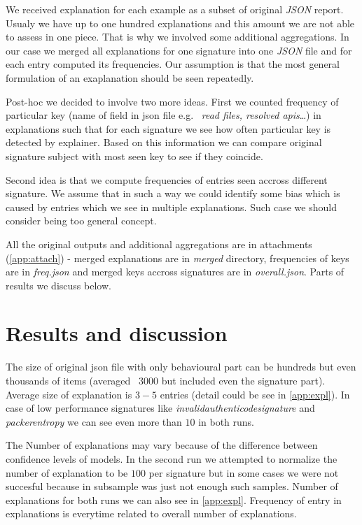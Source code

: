 We received explanation for each example as a subset of original \emph{JSON} report. Usualy we have up to one hundred explanations and this amount we are not able to assess in one piece. That is why we involved some additional aggregations. In our case we merged all explanations for one signature into one \emph{JSON} file and for each entry computed its frequencies. Our assumption is that the most general formulation of an exaplanation should be seen repeatedly. 

Post-hoc we decided to involve two more ideas. First we counted frequency of particular key (name of field in json file e.g. \ \emph{read files, resolved apis}\dots) in explanations such that for each signature we see how often particular key is detected by explainer. Based on this information we can compare original signature subject with most seen key to see if they coincide.

Second idea is that we compute frequencies of entries seen accross different signature. We assume that in such a way we could identify some bias which is caused by entries which we see in multiple explanations. Such case we should consider being too general concept. 

All the original outputs and additional aggregations are in attachments (\ref{app:attach}) - merged explanations are in \emph{merged} directory, frequencies of keys are in \emph{freq.json} and merged keys accross signatures are in \emph{overall.json}. Parts of results we discuss below.


\section{Results and discussion}
The size of original json file with only behavioural part can be hundreds but even thousands of items (averaged \texttildelow~$3000$ but included even the signature part). Average size of explanation is $3-5$ entries (detail could be see in \ref{app:expl}). In case of low performance signatures like \emph{invalidauthenticodesignature} and \emph{packerentropy} we can see even more than $10$ in both runs.

The Number of explanations may vary because of the difference between confidence levels of models. In the second run we attempted to normalize the number of explanation to be $100$ per signature but in some cases we were not succesful because in subsample was just not enough such samples. Number of explanations for both runs we can also see in \ref{app:expl}. Frequency of entry in explanations is everytime related to overall number of explanations.

